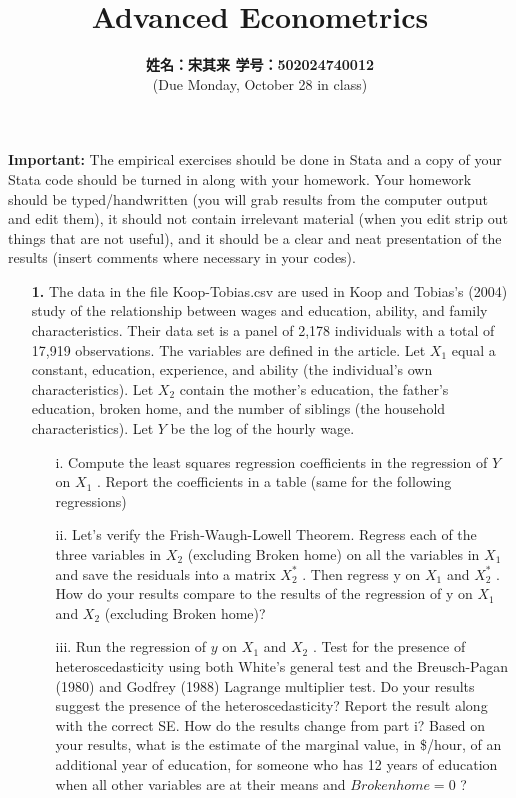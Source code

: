 \documentclass[a4paper]{ctexart}
\title{\vspace{-0.3in}\textbf{Advanced Econometrics}}
\author{\textbf{姓名：宋其来 \quad 学号：502024740012}\\(Due Monday, October 28 in class)}
\date{}
\theoremstyle{remark}
\begin{document}
\maketitle
\textbf{Important: }
The empirical exercises should be done in Stata and a copy of your Stata code should be turned in along with your homework. Your homework should be typed/handwritten (you will grab results from the computer output and edit them), it should not contain irrelevant material (when you edit strip out things that are not useful), and it should be a clear and neat presentation of the results (insert comments where necessary in your codes).
\begin{itemize}
    \item [\textbf{1.}]The data in the file Koop-Tobias.csv are used in Koop and Tobias’s (2004) study of the relationship between wages and education, ability, and family characteristics. Their data set is a panel of 2,178 individuals with a total of 17,919 observations. The variables are defined in the article. Let $X_{1}$ equal a constant, education, experience, and ability (the individual’s own characteristics). Let $X_{2}$ contain the mother’s education, the father’s education, broken home, and the number of siblings (the household characteristics). Let $Y$ be the log of the hourly wage.
    \begin{enumerate}
        \item[i.]Compute the least squares regression coefficients in the regression of $Y$ on $X_{1}$ . Report the coefficients in a table (same for the following regressions)
        \item[ii.]Let’s verify the Frish-Waugh-Lowell Theorem. Regress each of the three variables in $X_{2}$ (excluding Broken home) on all the variables in $X_{1}$ and save the residuals into a matrix $X_{2}^{*}$ . Then regress y on $X_{1}$ and $X_{2}^{*}$ . How do your results compare to the results of the regression of y on $X_{1}$ and $X_{2}$ (excluding Broken home)?
        \item[iii.]Run the regression of $y$ on $X_{1}$ and $X_{2}$ . Test for the presence of heteroscedasticity using both White’s general test and the Breusch-Pagan (1980) and Godfrey (1988) Lagrange multiplier test. Do your results suggest the presence of the heteroscedasticity? Report the result along with the correct SE. How do the results change from part i? Based on your results, what is the estimate of the marginal value, in \$/hour, of an additional year of education, for someone who has 12 years of education when all other variables are at their means and $Broken home=0$ ?

\end{enumerate}
\end{itemize}
\end{document}

